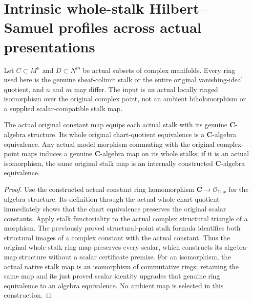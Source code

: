 \section{Intrinsic whole-stalk Hilbert--Samuel profiles across actual presentations}

Let $C\subset M^n$ and $D\subset N^m$ be actual subsets of complex manifolds.
Every ring used here is the genuine sheaf-colimit stalk or the entire
original vanishing-ideal quotient, and $n$ and $m$ may differ. The input
is an actual locally ringed isomorphism over the original complex point,
not an ambient biholomorphism or a supplied scalar-compatible stalk map.

\begin{theorem}
\label{hir:actual-analytic-subspace-intrinsic-stalk-algebra}
\leanok
The actual original constant map equips each actual stalk with its genuine
$\mathbf C$-algebra structure. Its whole original chart-quotient equivalence
is a $\mathbf C$-algebra equivalence. Any actual model morphism commuting
with the original complex-point maps induces a genuine $\mathbf C$-algebra
map on its whole stalks; if it is an actual isomorphism, the same original
stalk map is an internally constructed $\mathbf C$-algebra equivalence.
\end{theorem}
\begin{proof}
Use the constructed actual constant ring homomorphism $\mathbf C\to\mathcal
O_{C,x}$ for the algebra structure. Its definition through the actual whole
chart quotient immediately shows that the chart equivalence preserves the
original scalar constants. Apply stalk functoriality to the actual complex
structural triangle of a morphism. The previously proved structural-point
stalk formula identifies both structural images of a complex constant with
the actual constant. Thus the original whole stalk ring map preserves every
scalar, which constructs its algebra-map structure without a scalar
certificate premise. For an isomorphism, the actual native stalk map is an
isomorphism of commutative rings; retaining the same map and its just proved
scalar identity upgrades that genuine ring equivalence to an algebra
equivalence. No ambient map is selected in this construction.
\end{proof}

